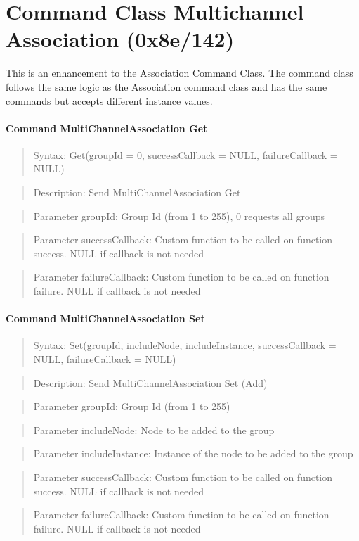 \section{Command Class Multichannel Association (0x8e/142)}

This is an enhancement to the Association Command Class. The command class follows the same logic as the Association command class and 
has the same commands but accepts different instance values. 

\paragraph {Command MultiChannelAssociation Get}
\begin{quote} Syntax: Get(groupId = 0, successCallback = NULL, failureCallback = NULL)\end{quote}
\begin{quote} Description: Send MultiChannelAssociation Get\end{quote}
\begin{quote} Parameter groupId: Group Id (from 1 to 255), 0 requests all groups\end{quote}
\begin{quote} Parameter successCallback: Custom function to be called on function success. NULL if callback is not needed\end{quote}
\begin{quote} Parameter failureCallback: Custom function to be called on function failure. NULL if callback is not needed\end{quote}

\paragraph {Command MultiChannelAssociation Set}
\begin{quote} Syntax: Set(groupId, includeNode, includeInstance, successCallback = NULL, failureCallback = NULL)\end{quote}
\begin{quote} Description: Send MultiChannelAssociation Set (Add)\end{quote}
\begin{quote} Parameter groupId: Group Id (from 1 to 255)\end{quote}
\begin{quote} Parameter includeNode: Node to be added to the group\end{quote}
\begin{quote} Parameter includeInstance: Instance of the node to be added to the group\end{quote}
\begin{quote} Parameter successCallback: Custom function to be called on function success. NULL if callback is not needed\end{quote}
\begin{quote} Parameter failureCallback: Custom function to be called on function failure. NULL if callback is not needed\end{quote}

